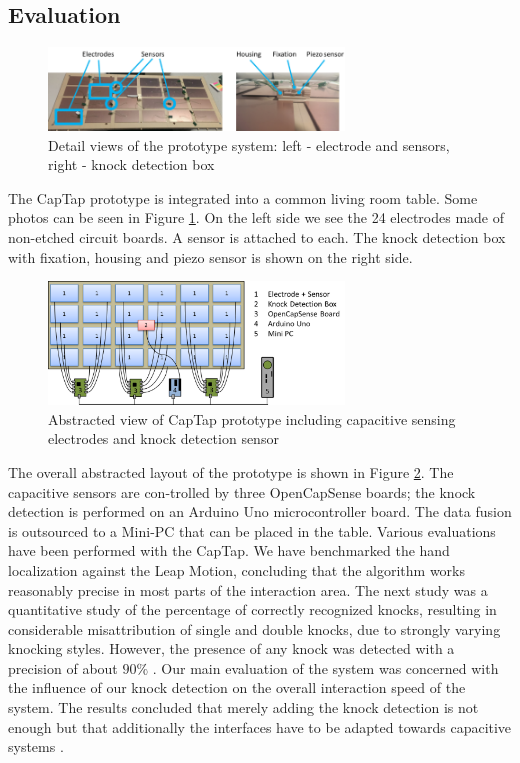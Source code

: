 \subsection{Evaluation}
\begin{figure}[h]
\centering
\includegraphics[width=0.7\textwidth]{images/captap_proto}
\caption{Detail views of the prototype system: left - electrode and sensors, right - knock detection box \cite{Braun2013ChairAid}}
\label{fig:captap_proto}
\end{figure}
The CapTap prototype is integrated into a common living room table. Some photos can be seen in Figure \ref{fig:captap_proto}. On the left side we see the 24 electrodes made of non-etched circuit boards. A sensor is attached to each. The knock detection box with fixation, housing and piezo sensor is shown on the right side.
\begin{figure}[h]
\centering
\includegraphics[width=0.7\textwidth]{images/captap_system}
\caption{Abstracted view of CapTap prototype including capacitive sensing electrodes and knock detection sensor \cite{Braun2013ChairAid}}
\label{fig:captap_system}
\end{figure} 
The overall abstracted layout of the prototype is shown in Figure \ref{fig:captap_system}. The capacitive sensors are con-trolled by three OpenCapSense boards; the knock detection is performed on an Arduino Uno microcontroller board. The data fusion is outsourced to a Mini-PC that can be placed in the table.
Various evaluations have been performed with the CapTap. We have benchmarked the hand localization against the Leap Motion, concluding that the algorithm works reasonably precise in most parts of the interaction area. The next study was a quantitative study of the percentage of correctly recognized knocks, resulting in considerable misattribution of single and double knocks, due to strongly varying knocking styles. However, the presence of any knock was detected with a precision of about $90\%$ \cite{Braun2013ChairAid}. Our main evaluation of the system was concerned with the influence of our knock detection on the overall interaction speed of the system. The results concluded that merely adding the knock detection is not enough but that additionally the interfaces have to be adapted towards capacitive systems \cite{Braun2013ChairAid}.
